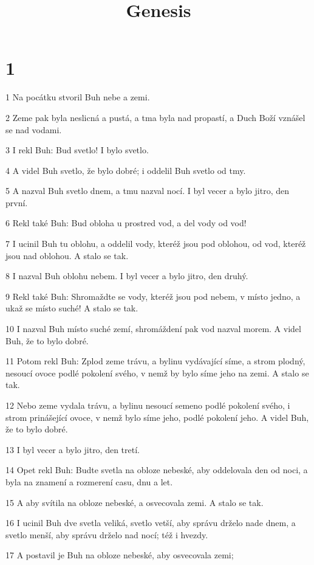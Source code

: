 

\title{Genesis}

\chapter{1}

\par 1 Na pocátku stvoril Buh nebe a zemi.
\par 2  Zeme pak byla neslicná a pustá, a tma byla nad propastí, a Duch Boží vznášel se nad vodami.
\par 3  I rekl Buh: Bud svetlo! I bylo svetlo.
\par 4  A videl Buh svetlo, že bylo dobré; i oddelil Buh svetlo od tmy.
\par 5  A nazval Buh svetlo dnem, a tmu nazval nocí. I byl vecer a bylo jitro, den první.
\par 6  Rekl také Buh: Bud obloha u prostred vod, a del vody od vod!
\par 7  I ucinil Buh tu oblohu, a oddelil vody, kteréž jsou pod oblohou, od vod, kteréž jsou nad oblohou. A stalo se tak.
\par 8  I nazval Buh oblohu nebem. I byl vecer a bylo jitro, den druhý.
\par 9  Rekl také Buh: Shromaždte se vody, kteréž jsou pod nebem, v místo jedno, a ukaž se místo suché! A stalo se tak.
\par 10  I nazval Buh místo suché zemí, shromáždení pak vod nazval morem. A videl Buh, že to bylo dobré.
\par 11  Potom rekl Buh: Zplod zeme trávu, a bylinu vydávající síme, a strom plodný, nesoucí ovoce podlé pokolení svého, v nemž by bylo síme jeho na zemi. A stalo se tak.
\par 12  Nebo zeme vydala trávu, a bylinu nesoucí semeno podlé pokolení svého, i strom prinášející ovoce, v nemž bylo síme jeho, podlé pokolení jeho. A videl Buh, že to bylo dobré.
\par 13  I byl vecer a bylo jitro, den tretí.
\par 14  Opet rekl Buh: Budte svetla na obloze nebeské, aby oddelovala den od noci, a byla na znamení a rozmerení casu, dnu a let.
\par 15  A aby svítila na obloze nebeské, a osvecovala zemi. A stalo se tak.
\par 16  I ucinil Buh dve svetla veliká, svetlo vetší, aby správu drželo nade dnem, a svetlo menší, aby správu drželo nad nocí; též i hvezdy.
\par 17  A postavil je Buh na obloze nebeské, aby osvecovala zemi;
